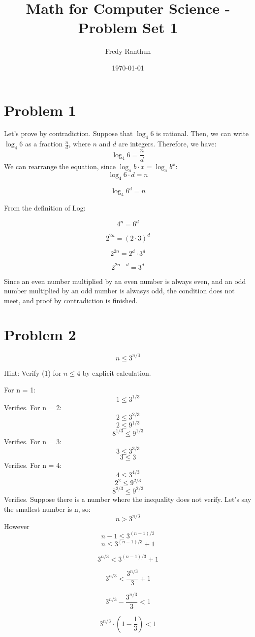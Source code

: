 \documentclass{article}
\title{Math for Computer Science - Problem Set 1}
\author{Fredy Ranthun}
\date{\today}
\begin{document}
\maketitle

\section*{Problem 1}
Let's prove by contradiction. Suppose that $\log_{4}6$ is rational. Then, we can write $\log_{4}6$ as a fraction $\frac{n}{d}$, where $n$ and $d$ are integers. Therefore, we have:
\[
  \log_{4}6 = \frac{n}{d}
\]
We can rearrange the equation, since $\log_{a}b \cdot x = \log_{a}b^x$:
\[
  \log_{4}6 \cdot d = n
\]

\[
  \log_{4}6^d = n
\]

From the definition of Log:

\[
  4^n = 6^d
\]

\[
  2^{2n} = (2 \cdot 3)^d
\]

\[
  2^{2n} = 2^d \cdot 3^d
\]

\[
  2^{2n - d} = 3^d
\]

Since an even number multiplied by an even number is always even,
and an odd number multiplied by an odd number is alwasys odd,
the condition does not meet, and proof by contradiction is finished.

\section*{Problem 2}
\[
  n \leq 3^{n/3}
\]

Hint: Verify (1) for $n \leq 4$ by explicit calculation.

For n = 1:
\[
  1 \leq 3^{1/3}
\]
Verifies.
For n = 2:
\[
  2 \leq 3^{2/3}
\]
\[
  2 \leq 9^{1/3}
\]
\[
  8^{1/3} \leq 9^{1/3}
\]
Verifies.
For n = 3:
\[
  3 \leq 3^{3/3}
\]
\[
  3 \leq 3
\]
Verifies.
For n = 4:
\[
  4 \leq 3^{4/3}
\]
\[
  2^2 \leq 9^{2/3}
\]
\[
  8^{2/3} \leq 9^{2/3}
\]
Verifies.
Suppose there is a number where the inequality does not verify. Let's say the smallest number is n, so:
\[
  n > 3^{n/3}
\]
However
\[
  n - 1 \leq 3^{(n - 1)/3}
\]
\[
  n \leq 3^{(n - 1)/3} + 1
\]

\[
  3^{n/3} < 3^{(n - 1)/3} + 1
\]

\[
  3^{n/3} < \frac{3^{n/3}}{3} + 1
\]


\[
  3^{n/3} - \frac{3^{n/3}}{3} < 1
\]

\[
  3^{n/3} \cdot(1 - \frac{1}{3}) < 1
\]
\end{document}
